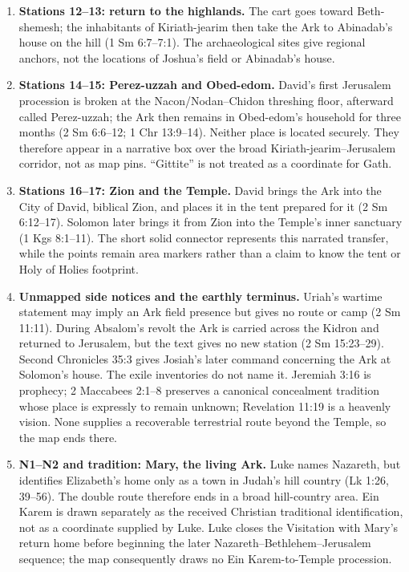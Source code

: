\begin{enumerate}[leftmargin=2.0em]
    Gath, and Ekron; the registered Brenton Septuagint names Ashdod, Gath, and
    Ashkelon.  The figure plots the first branch and prints the second in its
    key.  Gaza occurs only in the five-lord offering list.  The departure of
    the cow-drawn cart from the last-named city is implied by narrative
    continuity rather than freshly named at 1 Samuel 6:7.
  \item \textbf{Stations 12--13: return to the highlands.} The cart goes toward Beth-shemesh;
    the inhabitants of Kiriath-jearim then take the Ark to Abinadab's house on
    the hill (1 Sm 6:7--7:1).  The archaeological sites give regional anchors,
    not the locations of Joshua's field or Abinadab's house.
  \item \textbf{Stations 14--15: Perez-uzzah and Obed-edom.} David's first Jerusalem procession
    is broken at the Nacon/Nodan--Chidon threshing floor, afterward called
    Perez-uzzah; the Ark then remains in Obed-edom's household for three months
    (2 Sm 6:6--12; 1 Chr 13:9--14).  Neither place is located securely.
    They therefore appear in a narrative box over the broad
    Kiriath-jearim--Jerusalem corridor, not as map pins.  ``Gittite'' is not
    treated as a coordinate for Gath.
  \item \textbf{Stations 16--17: Zion and the Temple.} David brings the Ark into the City of
    David, biblical Zion, and places it in the tent prepared for it
    (2 Sm 6:12--17).  Solomon later brings it from Zion into the Temple's inner
    sanctuary (1 Kgs 8:1--11).  The short solid connector represents this
    narrated transfer, while the points remain area markers rather than a
    claim to know the tent or Holy of Holies footprint.
  \item \textbf{Unmapped side notices and the earthly terminus.} Uriah's
    wartime statement may imply an Ark field presence but gives no route or
    camp (2 Sm 11:11).  During Absalom's revolt the Ark is carried across the
    Kidron and returned to Jerusalem, but the text gives no new station
    (2 Sm 15:23--29).  Second Chronicles 35:3 gives
    Josiah's later command concerning the Ark at Solomon's house.  The exile
    inventories do not name it.  Jeremiah 3:16 is prophecy; 2 Maccabees 2:1--8
    preserves a canonical concealment tradition whose place is expressly to
    remain unknown; Revelation 11:19 is a heavenly vision.  None supplies a
    recoverable terrestrial route beyond the Temple, so the map ends there.
  \item \textbf{N1--N2 and tradition: Mary, the living Ark.} Luke names Nazareth, but identifies
    Elizabeth's home only as a town in Judah's hill country (Lk 1:26, 39--56).
    The double route therefore ends in a broad hill-country area.  Ein Karem is
    drawn separately as the received Christian traditional identification,
    not as a coordinate supplied by Luke.  Luke closes the Visitation with
    Mary's return home before beginning the later Nazareth--Bethlehem--Jerusalem
    sequence; the map consequently draws no Ein Karem-to-Temple procession.
\end{enumerate}

